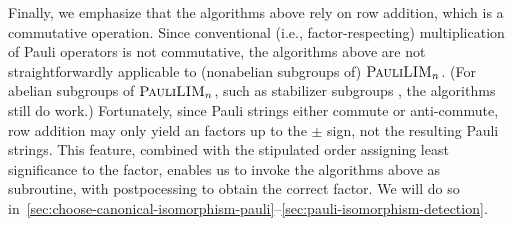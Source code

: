 Finally, we emphasize that the algorithms above rely on row addition, which is a commutative operation.
Since conventional (i.e., factor-respecting) multiplication of Pauli operators is not commutative, the algorithms above are not straightforwardly applicable to (nonabelian subgroups of) $\textnormal{\sc PauliLIM}_n$.
(For abelian subgroups of $\textnormal{\sc PauliLIM}_n$, such as stabilizer subgroups \cite{aaronson2008improved}, the algorithms still do work.)
Fortunately, since Pauli strings either commute or anti-commute, row addition may only yield an factors up to the $\pm$ sign, not the resulting Pauli strings.
This feature, combined with the stipulated order assigning least significance to the factor,
enables us to invoke the algorithms above as subroutine, with postpocessing to obtain the correct factor.
We will do so in~\autoref{sec:choose-canonical-isomorphism-pauli}--\ref{sec:pauli-isomorphism-detection}.
%
%










